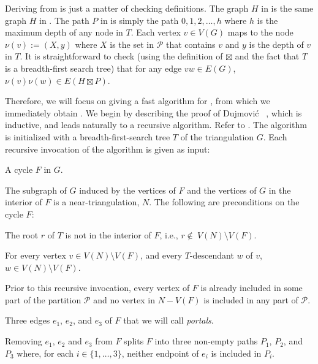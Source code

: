 \documentclass[kpfonts]{patmorin}
\begin{document}
Deriving  from  is just a matter of checking definitions.  The graph $H$ in  is the same graph $H$ in . The path $P$ in  is simply the path $0,1,2,\ldots,h$ where $h$ is the maximum depth of any node in $T$.  Each vertex $v\in V(G)$ maps to the node $\nu(v):=(X,y)$ where $X$ is the set in $\mathcal{P}$ that contains $v$ and $y$ is the depth of $v$ in $T$.  It is straightforward to check (using the definition of $\boxtimes$ and the fact that $T$ is a breadth-first search tree) that for any  edge $vw\in E(G)$, $\nu(v)\nu(w)\in E(H\boxtimes P)$.

Therefore, we will focus on giving a fast algorithm for , from which we immediately obtain .  We begin by describing the proof of Dujmović \etal\  \cite{dujmovic.joret.ea:planar}, which is inductive, and leads naturally to a recursive algorithm.  Refer to . The algorithm is initialized with a breadth-first-search tree $T$ of the triangulation $G$.  Each recursive invocation of the algorithm is given as input:
\begin{compactenum}
  \item A cycle $F$ in $G$.

  The subgraph of $G$ induced by the vertices of $F$ and the vertices of $G$ in the interior of $F$ is a near-triangulation, $N$.  The following are preconditions on the cycle $F$:
  \begin{compactenum}[(P1)]
    \item The root $r$ of $T$ is not in the interior of $F$, i.e., $r\not\in\ V(N)\setminus V(F)$.
    \item For every vertex $v\in V(N)\setminus V(F)$, and every $T$-descendant $w$ of $v$, $w\in V(N)\setminus V(F)$.
    \item Prior to this recursive invocation, every vertex of $F$ is already included in some part of the partition $\mathcal{P}$ and no vertex in $N-V(F)$ is included in any part of $\mathcal{P}$.
  \end{compactenum}
  \item Three edges $e_1$, $e_2$, and $e_3$ of $F$ that we will call \emph{portals}.

  Removing $e_1$, $e_2$ and $e_3$ from $F$ splits $F$ into three non-empty paths $P_1$, $P_2$, and $P_3$ where, for each $i\in\{1,\ldots,3\}$, neither endpoint of $e_i$ is included in $P_i$.
\end{compactenum}
\end{document}
